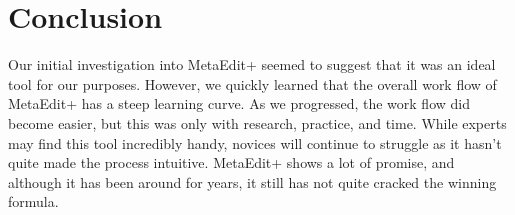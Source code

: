 \section{Conclusion}
Our initial investigation into MetaEdit+ seemed to suggest that it was an ideal tool for our purposes.  However, we quickly learned that the overall work flow of MetaEdit+ has a steep learning curve.  As we progressed, the work flow did become easier, but this was only with research, practice, and time.  While experts may find this tool incredibly handy, novices will continue to struggle as it hasn't quite made the process intuitive.  MetaEdit+ shows a lot of promise, and although it has been around for years, it still has not quite cracked the winning formula.